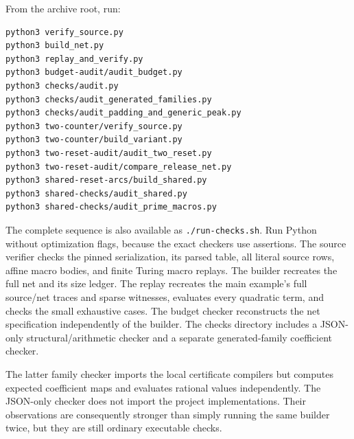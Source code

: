 \documentclass[11pt,letterpaper]{article}
\theoremstyle{definition}
\theoremstyle{remark}
\newcommand{\rncode}[1]{\texttt{#1}}
\begin{document}
From the archive root, run:
\begin{lstlisting}[language=bash]
python3 verify_source.py
python3 build_net.py
python3 replay_and_verify.py
python3 budget-audit/audit_budget.py
python3 checks/audit.py
python3 checks/audit_generated_families.py
python3 checks/audit_padding_and_generic_peak.py
python3 two-counter/verify_source.py
python3 two-counter/build_variant.py
python3 two-reset-audit/audit_two_reset.py
python3 two-reset-audit/compare_release_net.py
python3 shared-reset-arcs/build_shared.py
python3 shared-checks/audit_shared.py
python3 shared-checks/audit_prime_macros.py
\end{lstlisting}
The complete sequence is also available as \rncode{./run-checks.sh}. Run Python without optimization flags, because the exact checkers use assertions. The source verifier checks the pinned serialization, its parsed table, all literal source rows, affine macro bodies, and finite Turing macro replays. The builder recreates the full net and its size ledger. The replay recreates the main example's full source/net traces and sparse witnesses, evaluates every quadratic term, and checks the small exhaustive cases. The budget checker reconstructs the net specification independently of the builder. The checks directory includes a JSON-only structural/arithmetic checker and a separate generated-family coefficient checker.

The latter family checker imports the local certificate compilers but computes expected coefficient maps and evaluates rational values independently. The JSON-only checker does not import the project implementations. Their observations are consequently stronger than simply running the same builder twice, but they are still ordinary executable checks.
\end{document}
